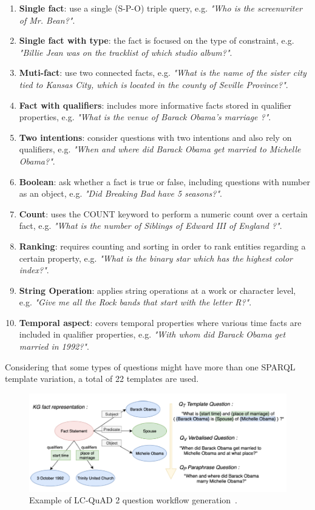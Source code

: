 \begin{enumerate}
    \item \textbf{Single fact}: use a single (S-P-O) triple query, e.g. \textit{"Who is the 
    screenwriter of Mr. Bean?"}.
    \item \textbf{Single fact with type}: the fact is focused on the type of constraint, e.g. 
    \textit{"Billie Jean was on the tracklist of which studio album?"}.
    \item \textbf{Muti-fact}: use two connected facts, e.g. \textit{"What is the name of the 
    sister city tied to Kansas City, which is located in the county of Seville Province?"}.
    \item \textbf{Fact with qualifiers}: includes more informative facts stored in qualifier 
    properties, e.g. \textit{"What is the venue of Barack Obama’s marriage ?"}.
    \item \textbf{Two intentions}: consider questions with two intentions and also rely on 
    qualifiers, e.g. \textit{"When and where did Barack Obama get married to Michelle Obama?"}.
    \item \textbf{Boolean}: ask whether a fact is true or false, including questions with 
    number as an object, e.g. \textit{"Did Breaking Bad have 5 seasons?"}.
    \item \textbf{Count}: uses the COUNT keyword to perform a numeric count over a certain fact, 
    e.g. \textit{"What is the number of Siblings of Edward III of England ?"}.
    \item \textbf{Ranking}: requires counting and sorting in order to rank entities regarding a 
    certain property, e.g. \textit{"What is the binary star which has the highest color index?"}.
    \item \textbf{String Operation}: applies string operations at a work or character level, 
    e.g. \textit{"Give me all the Rock bands that start with the letter R?"}.
    \item \textbf{Temporal aspect}: covers temporal properties where various time facts are 
    included in qualifier properties, e.g. \textit{"With whom did Barack Obama get married in 1992?"}.
\end{enumerate}

Considering that some types of questions might have more than one SPARQL template variation, a 
total of 22 templates are used. 

\begin{figure}[!h]
    \centering
    \includegraphics[scale=.55]{imagenes/2_theorical_framework/question_answering/lcquad2Workflow.PNG}
    \caption{Example of LC-QuAD 2 question workflow generation~\cite{dataset:lcquad2-DubeyBA019}.}
    \label{fig:lcquad2Pipeline}
\end{figure}

